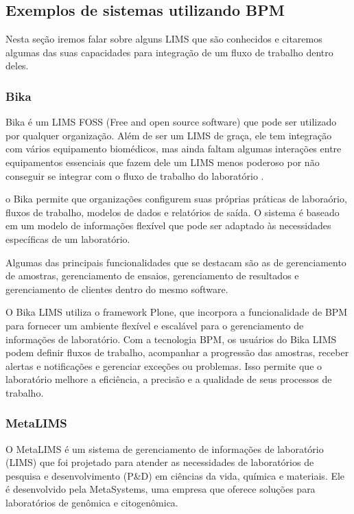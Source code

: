 \subsection{Exemplos de sistemas utilizando BPM} \label{sec:lims-exemplo}

Nesta seção iremos falar sobre alguns LIMS que são conhecidos e citaremos algumas das suas capacidades para integração de um fluxo de trabalho dentro deles.

\subsubsection{Bika}

Bika é um LIMS FOSS (Free and open source software) que pode ser utilizado por qualquer organização. Além de ser um LIMS de graça, ele tem integração com vários equipamento biomédicos, mas ainda faltam algumas interações entre equipamentos essenciais que fazem dele um LIMS menos poderoso por não conseguir se integrar com o fluxo de trabalho do laboratório \cite{Ademuyiwa2018DevelopmentBiobanking}.

o Bika permite que organizações configurem suas próprias práticas de laboraório, fluxos de trabalho, modelos de dados e relatórios de saída. O sistema é baseado em um modelo de informações flexível que pode ser adaptado às necessidades específicas de um laboratório.

Algumas das principais funcionalidades que se destacam são as de gerenciamento de amostras, gerenciamento de ensaios, gerenciamento de resultados e gerenciamento de clientes dentro do mesmo software.

O Bika LIMS utiliza o framework Plone, que incorpora a funcionalidade de BPM para fornecer um ambiente flexível e escalável para o gerenciamento de informações de laboratório. Com a tecnologia BPM, os usuários do Bika LIMS podem definir fluxos de trabalho, acompanhar a progressão das amostras, receber alertas e notificações e gerenciar exceções ou problemas. Isso permite que o laboratório melhore a eficiência, a precisão e a qualidade de seus processos de trabalho.

\subsubsection{MetaLIMS}

O MetaLIMS é um sistema de gerenciamento de informações de laboratório (LIMS) que foi projetado para atender as necessidades de laboratórios de pesquisa e desenvolvimento (P\&D) em ciências da vida, química e materiais. Ele é desenvolvido pela MetaSystems, uma empresa que oferece soluções para laboratórios de genômica e citogenômica.

